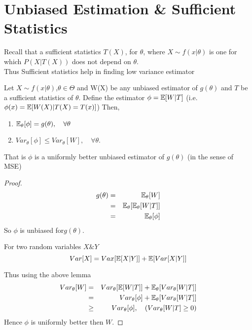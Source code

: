 \documentclass[a4paper,english,12pt]{article}
\begin{document}
\section{Unbiased Estimation \& Sufficient Statistics}
Recall that a sufficient statistics $T(X)$, for $\theta$, where $X \sim f(x|\theta)$ is one for which $P(X|T(X))$ does not depend on $\theta$. \\
Thus Sufficient statistics help in finding low variance estimator

\begin{thm}
Let $X \sim f(x|\theta)$,$\theta \in \Theta$ and W(X) be any unbiased estimator of $g(\theta)$ and $T$ be a sufficient statistics of $\theta$. Define the estimator $\phi = \mathbb{E}[W|T]$ (i.e. $\phi(x) = \mathbb{E}[W(X)|T(X) = T(x)]$)
Then,
\begin{enumerate}
\item $\mathbb{E}_\theta[\phi] = g(\theta), \quad \forall \theta$
\item $Var_\theta[\phi] \leq Var_\theta[W], \quad \forall \theta$.
\end{enumerate}
That is $\phi$ is a uniformly better unbiased estimator of $g(\theta)$ (in the sense of MSE)
\begin{proof}
\begin{eqnarray*}
g(\theta) &=& \mathbb{E}_\theta[W]\\
&=& \mathbb{E}_\theta[\mathbb{E}_\theta[W|T]] \\
&=& \mathbb{E}_\theta[\phi]
\end{eqnarray*}
So $\phi$ is unbiased for$g(\theta)$.

\begin{lem}
For two random variables $X \& Y$
\begin{equation}
Var[X] = Vax[\mathbb{E}[X|Y]]  + \mathbb{E}[Var[X|Y]]
\end{equation}	
\end{lem}

Thus using the above lemma
\begin{eqnarray*}
Var_\theta[W] &=& Var_\theta[\mathbb{E}[W|T]] + \mathbb{E}_\theta[Var_\theta[W|T]]\\ &=&  Var_\theta[\phi] + \mathbb{E}_\theta[Var_\theta[W|T]] \\ 
&\geq& Var_\theta[\phi], \quad (Var_\theta[W|T]\geq 0)
\end{eqnarray*}
Hence $\phi$ is uniformly better then $W$.
\end{proof}
\end{thm}
\end{document}
